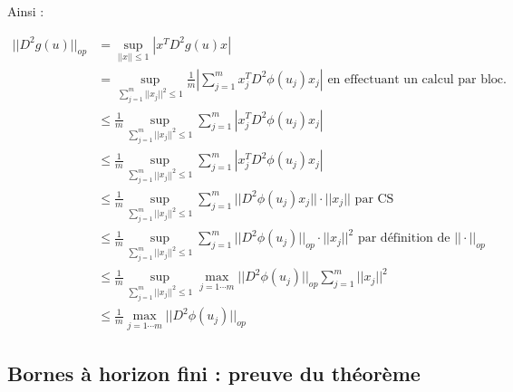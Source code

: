 \documentclass[a4paper, 11pt, french]{article}
\theoremstyle{definition}
\begin{document}
Ainsi :

\begin{align*}
	||D^2 g(u)||_{op} &= \sup_{||x|| \leq 1} |x^T D^2 g(u) x| \\
	&= \sup_{\sum_{j=1}^{m} ||x_j||^2 \leq 1} \frac{1}{m} \left | \sum_{j=1}^{m} x_j^T D^2 \phi (u_j) x_j \right | \text{ en effectuant un calcul par bloc.} \\
	&\leq \frac{1}{m} \sup_{\sum_{j=1}^{m} ||x_j||^2 \leq 1} \sum_{j=1}^{m} \left | x_j^T D^2 \phi (u_j) x_j \right | \\
	&\leq \frac{1}{m} \sup_{\sum_{j=1}^{m} ||x_j||^2 \leq 1} \sum_{j=1}^{m} \left | x_j^T D^2 \phi (u_j) x_j \right | \\
	&\leq \frac{1}{m} \sup_{\sum_{j=1}^{m} ||x_j||^2 \leq 1} \sum_{j=1}^{m} ||D^2 \phi (u_j) x_j|| \cdot ||x_j|| \text{ par CS} \\
	&\leq \frac{1}{m} \sup_{\sum_{j=1}^{m} ||x_j||^2 \leq 1} \sum_{j=1}^{m} ||D^2 \phi (u_j)||_{op} \cdot ||x_j||^2 \text{ par définition de $||\cdot||_{op}$} \\
	&\leq \frac{1}{m} \sup_{\sum_{j=1}^{m} ||x_j||^2 \leq 1} \max_{j=1\cdots m} ||D^2 \phi (u_j)||_{op} \sum_{j=1}^{m} ||x_j||^2 \\
	&\leq \frac{1}{m} \max_{j=1\cdots m} ||D^2 \phi (u_j)||_{op}
\end{align*}

\subsection{Bornes à horizon fini : preuve du théorème}
\end{document}
